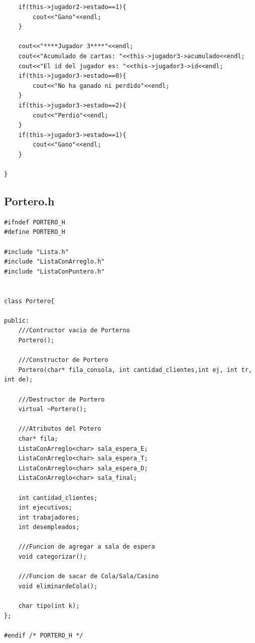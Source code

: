 \documentclass[11pt]{article}
\begin{document}
\begin{lstlisting}
    if(this->jugador2->estado==1){
        cout<<"Gano"<<endl;
    }
    
    cout<<"****Jugador 3****"<<endl;
    cout<<"Acumulado de cartas: "<<this->jugador3->acumulado<<endl;
    cout<<"El id del jugador es: "<<this->jugador3->id<<endl;    
    if(this->jugador3->estado==0){
        cout<<"No ha ganado ni perdido"<<endl;
    }
    if(this->jugador3->estado==2){
        cout<<"Perdio"<<endl;
    }
    if(this->jugador3->estado==1){
        cout<<"Gano"<<endl;
    }

}
\end{lstlisting}

\subsection{Portero.h}
\begin{lstlisting}
#ifndef PORTERO_H
#define PORTERO_H

#include "Lista.h"
#include "ListaConArreglo.h"
#include "ListaConPuntero.h"


class Portero{
    
public: 
    ///Contructor vacio de Porterno
    Portero();
    
    ///Constructor de Portero
    Portero(char* fila_consola, int cantidad_clientes,int ej, int tr, int de);
        
    ///Destructor de Portero
    virtual ~Portero();
    
    ///Atributos del Potero
    char* fila;
    ListaConArreglo<char> sala_espera_E;
    ListaConArreglo<char> sala_espera_T;
    ListaConArreglo<char> sala_espera_D;
    ListaConArreglo<char> sala_final;
    
    int cantidad_clientes;
    int ejecutivos;
    int trabajadores;
    int desempleados;
    
    ///Funcion de agregar a sala de espera
    void categorizar();
 
    ///Funcion de sacar de Cola/Sala/Casino
    void eliminardeCola();
    
    char tipo(int k);
};

#endif /* PORTERO_H */

\end{lstlisting}
\newpage
\end{document}
